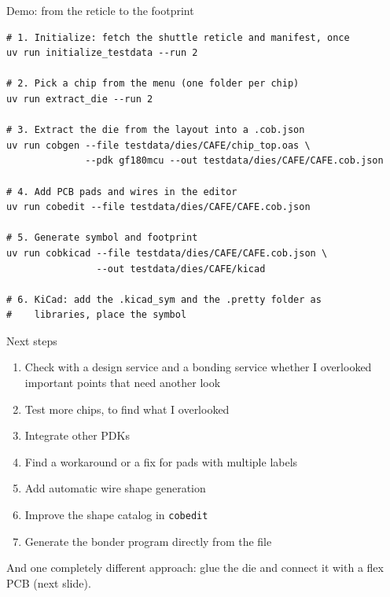 \documentclass[aspectratio=169,11pt]{beamer}
\begin{document}
\begin{frame}[fragile]{Demo: from the reticle to the footprint}
\begin{lstlisting}[language=cobshell, basicstyle=\ttfamily\scriptsize, commentstyle=\color{cobblue}\bfseries]
# 1. Initialize: fetch the shuttle reticle and manifest, once
uv run initialize_testdata --run 2

# 2. Pick a chip from the menu (one folder per chip)
uv run extract_die --run 2

# 3. Extract the die from the layout into a .cob.json
uv run cobgen --file testdata/dies/CAFE/chip_top.oas \
              --pdk gf180mcu --out testdata/dies/CAFE/CAFE.cob.json

# 4. Add PCB pads and wires in the editor
uv run cobedit --file testdata/dies/CAFE/CAFE.cob.json

# 5. Generate symbol and footprint
uv run cobkicad --file testdata/dies/CAFE/CAFE.cob.json \
                --out testdata/dies/CAFE/kicad

# 6. KiCad: add the .kicad_sym and the .pretty folder as
#    libraries, place the symbol
\end{lstlisting}
\end{frame}

\begin{frame}{Next steps}
  \begin{enumerate}\setlength\itemsep{0.55em}
    \item Check with a design service and a bonding service whether I overlooked important points that need another look
    \item Test more chips, to find what I overlooked
    \item Integrate other PDKs
    \item Find a workaround or a fix for pads with multiple labels
    \item Add automatic wire shape generation
    \item Improve the shape catalog in \texttt{cobedit}
    \item Generate the bonder program directly from the file
  \end{enumerate}
  \vfill
  \begin{center}\small\color{cobgrey}
    And one completely different approach: glue the die and connect it with a flex PCB (next slide).
  \end{center}
\end{frame}
\end{document}
